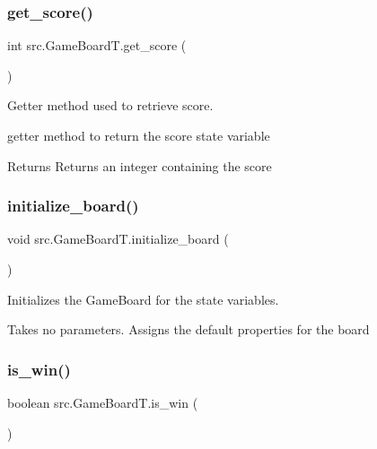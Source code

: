 \subsubsection{\texorpdfstring{get\+\_\+score()}{get\_score()}}
{\footnotesize\ttfamily int src.\+Game\+Board\+T.\+get\+\_\+score (\begin{DoxyParamCaption}{ }\end{DoxyParamCaption})}



Getter method used to retrieve score. 

getter method to return the score state variable \begin{DoxyReturn}{Returns}
Returns an integer containing the score 
\end{DoxyReturn}
\mbox{\label{classsrc_1_1GameBoardT_a4e7f32af1e3a2e28f4579fe6c74ce7e4}} 
\subsubsection{\texorpdfstring{initialize\+\_\+board()}{initialize\_board()}}
{\footnotesize\ttfamily void src.\+Game\+Board\+T.\+initialize\+\_\+board (\begin{DoxyParamCaption}{ }\end{DoxyParamCaption})}



Initializes the Game\+Board for the state variables. 

Takes no parameters. Assigns the default properties for the board \mbox{\label{classsrc_1_1GameBoardT_aa1221629c1ad21ce5931718b599bbabb}} 
\subsubsection{\texorpdfstring{is\+\_\+win()}{is\_win()}}
{\footnotesize\ttfamily boolean src.\+Game\+Board\+T.\+is\+\_\+win (\begin{DoxyParamCaption}{ }\end{DoxyParamCaption})}



